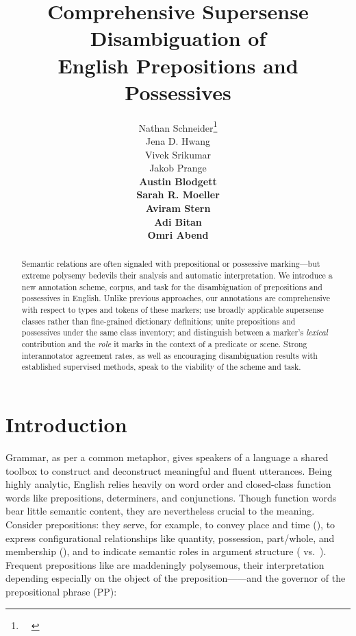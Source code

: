 \pdfoutput=1 \documentclass[11pt,a4paper]{article}
\title{Comprehensive Supersense Disambiguation of\\ English Prepositions and Possessives}
\author{
Nathan Schneider\thanks{~~\emldisplay{nathan.schneider@georgetown.edu}{nathan.schneider@georgetown.edu}} \\
	\textsmaller[.5]{Georgetown University} 
     \And
Jena D. Hwang \\
	\textsmaller[.5]{IHMC} 
\And
Vivek Srikumar \\
	\textsmaller[.5]{University of Utah} 
\AND
Jakob Prange\\
\bf Austin Blodgett \\
	\textsmaller[.5]{Georgetown University} 
\And 
Sarah R. Moeller \\
	\textsmaller[.5]{University of Colorado Boulder} 
\And
Aviram Stern\\
\bf Adi Bitan\\
\bf Omri Abend \\
	\textsmaller[.5]{Hebrew University of Jerusalem} 
}
\date{}
\begin{document}
\maketitle
\begin{abstract}
  Semantic relations are often signaled with prepositional or possessive marking---but extreme polysemy bedevils their analysis and automatic interpretation.
  We introduce a new annotation scheme, corpus, and task for the disambiguation 
  of prepositions and possessives in English.
  Unlike previous approaches, our annotations are comprehensive with respect to types and tokens of these markers; 
  use broadly applicable supersense classes rather than fine-grained dictionary definitions; 
  unite prepositions and possessives under the same class inventory; 
  and distinguish between a marker's \emph{lexical} contribution and the \emph{role} it marks in the context of a predicate or scene.
Strong interannotator agreement rates, as well as encouraging disambiguation results with established supervised methods, speak to the viability of the scheme and task.
\end{abstract}

\section{Introduction}

Grammar, as per a common metaphor, gives speakers of a language a shared toolbox to construct and deconstruct meaningful and fluent utterances. Being highly analytic, English relies heavily on word order and closed-class function words like prepositions, determiners, and conjunctions. Though function words bear little semantic content, they are nevertheless crucial to the meaning. Consider prepositions: they serve, for example, to convey place and time (), to express configurational relationships like quantity, possession, part/whole, and membership (), and to indicate semantic roles in argument structure ( vs.~).
Frequent prepositions like  are maddeningly polysemous, their interpretation depending especially on the object of the preposition------and the governor of the prepositional phrase (PP): 
\end{document}
